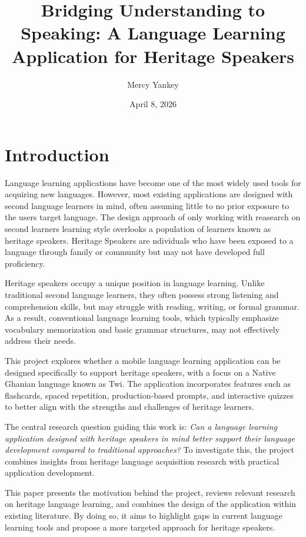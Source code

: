 \documentclass[12pt]{article}
\title{\textbf{Bridging Understanding to Speaking: A Language Learning Application for Heritage Speakers}}
\author{Mercy Yankey}
\date{April 8, 2026}
\begin{document}
\maketitle

\section{Introduction}

   Language learning applications have become one of the most widely used tools for acquiring new languages. However, most existing applications are designed with second language learners in mind, often assuming little to no prior exposure to the users target language. The design approach of only working with reasearch on second learners learning style overlooks a  population of learners known as heritage speakers. Heritage Speakers are ndividuals who have been exposed to a language through family or community but may not have developed full proficiency.

	

   Heritage speakers occupy a unique position in language learning. Unlike traditional second language learners, they often possess strong listening and comprehension skills, but may struggle with reading, writing, or formal grammar. As a result, conventional language learning tools, which typically emphasize vocabulary memorization and basic grammar structures, may not effectively address their needs.


	 
   This project explores whether a mobile language learning application can be designed specifically to support heritage speakers, with a focus on a Native Ghanian language known as Twi. The application incorporates features such as flashcards, spaced repetition, production-based prompts, and interactive quizzes to better align with the strengths and challenges of heritage learners.


   The central research question guiding this work is: \textit{Can a language learning application designed with heritage speakers in mind better support their language development compared to traditional approaches?} To investigate this, the project combines insights from heritage language acquisition research with practical application development.


	 This paper presents the motivation behind the project, reviews relevant research on heritage language learning, and combines the design of the application within existing literature. By doing so, it aims to highlight gaps in current language learning tools and propose a more targeted approach for heritage speakers.
\end{document}
